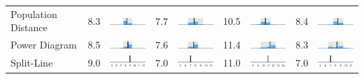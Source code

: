 \begin{table}
\begin{tabular}{l rm{7em} rm{7em} rm{7em} rm{7em}}
Population Distance    &   8.3 &       \includegraphics[width=7em]{mini_hist/PA_2000_dist_p} &   7.7 &       \includegraphics[width=7em]{mini_hist/PA_2004_dist_p} &  10.5 &       \includegraphics[width=7em]{mini_hist/PA_2008_dist_p} &   8.4 &       \includegraphics[width=7em]{mini_hist/PA_2012_dist_p} \\
Power Diagram          &   8.5 &        \includegraphics[width=7em]{mini_hist/PA_2000_power} &   7.6 &        \includegraphics[width=7em]{mini_hist/PA_2004_power} &  11.4 &        \includegraphics[width=7em]{mini_hist/PA_2008_power} &   8.3 &        \includegraphics[width=7em]{mini_hist/PA_2012_power} \\
Split-Line             &   9.0 &        \includegraphics[width=7em]{mini_hist/PA_2000_split_ax} &   7.0 &        \includegraphics[width=7em]{mini_hist/PA_2004_split_ax} &  11.0 &        \includegraphics[width=7em]{mini_hist/PA_2008_split_ax} &   7.0 &        \includegraphics[width=7em]{mini_hist/PA_2012_split_ax} \\

\end{tabular}
\end{table}

